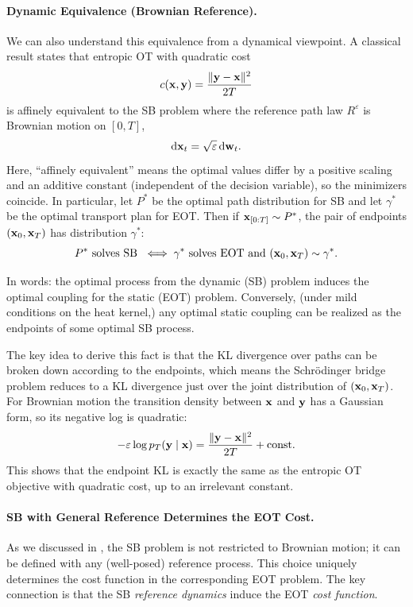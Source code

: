 \paragraph{Dynamic Equivalence (Brownian Reference).} We can also understand this equivalence from a dynamical viewpoint. 
A classical result \citep{mikami2006duality} states  that entropic OT with quadratic cost
\[
c({\mathbf{x}},{\mathbf{y}})=\frac{\|{\mathbf{y}}-{\mathbf{x}}\|^2}{2T}
\]
is affinely equivalent to the SB problem where the
reference path law $R^\varepsilon$ is Brownian motion on $[0,T]$,
\[
\mathrm{d}{\mathbf{x}}_t=\sqrt{\varepsilon}\,\mathrm{d}{\mathbf{w}}_t.
\]
Here, ``affinely equivalent'' means the optimal values differ by a positive scaling and an
additive constant (independent of the decision variable), so the minimizers coincide.
In particular, let $P^*$ be the optimal path distribution for SB and let $\gamma^*$ be the optimal transport plan for EOT. Then if ${\mathbf{x}}_{[0:T]}\sim P^*$, the pair of endpoints $({\mathbf{x}}_0,{\mathbf{x}}_T)$ has distribution $\gamma^*$:
\[
P^* \text{ solves SB } \iff \gamma^* \text{ solves EOT and } ({\mathbf{x}}_0,{\mathbf{x}}_T)\sim\gamma^*.
\]


In words: the optimal process from the dynamic (SB) problem induces the optimal
coupling for the static (EOT) problem. Conversely, (under mild conditions on the
heat kernel,) any optimal static coupling can be realized as the endpoints of some
optimal SB process.

The key idea to derive this fact is that the KL divergence over paths can be broken down according to the endpoints, which means the Schr\"odinger bridge problem reduces to a KL divergence just over the joint distribution of $({\mathbf{x}}_0,{\mathbf{x}}_T)$. For Brownian motion the transition density between ${\mathbf{x}}$ and ${\mathbf{y}}$ has a Gaussian form, so its negative log is quadratic:
\[
-\varepsilon\log p_T({\mathbf{y}}\mid{\mathbf{x}})=\frac{\|{\mathbf{y}}-{\mathbf{x}}\|^2}{2T}+\text{const}.
\]
This shows that the endpoint KL is exactly the same as the entropic OT objective with quadratic cost, up to an irrelevant constant.


\paragraph{SB with General Reference Determines the EOT Cost.}
As we discussed in , the SB problem is not restricted to Brownian motion; it can be defined with any (well-posed) reference process. This choice uniquely determines the cost function in the corresponding EOT problem. The key connection is that the SB \emph{reference dynamics} induce the EOT \emph{cost function}. 

